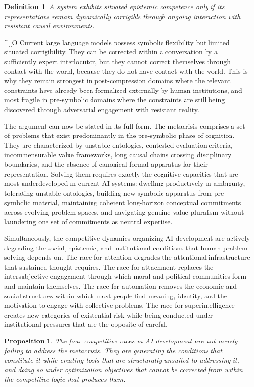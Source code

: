\documentclass[12pt, a4paper]{article}
\newtheorem{proposition}[theorem]{Proposition}
\newtheorem{definition}[theorem]{Definition}
\theoremstyle{remark}
\begin{document}
\begin{definition}
A system exhibits \emph{situated epistemic competence} only if its representations remain dynamically corrigible through ongoing interaction with resistant causal environments.
\end{definition}
^[[O
Current large language models possess symbolic flexibility but limited situated corrigibility. They can be corrected within a conversation by a sufficiently expert interlocutor, but they cannot correct themselves through contact with the world, because they do not have contact with the world. This is why they remain strongest in post-compression domains where the relevant constraints have already been formalized externally by human institutions, and most fragile in pre-symbolic domains where the constraints are still being discovered through adversarial engagement with resistant reality.

The argument can now be stated in its full form. The metacrisis comprises a set of problems that exist predominantly in the pre-symbolic phase of cognition. They are characterized by unstable ontologies, contested evaluation criteria, incommensurable value frameworks, long causal chains crossing disciplinary boundaries, and the absence of canonical formal apparatus for their representation. Solving them requires exactly the cognitive capacities that are most underdeveloped in current AI systems: dwelling productively in ambiguity, tolerating unstable ontologies, building new symbolic apparatus from pre-symbolic material, maintaining coherent long-horizon conceptual commitments across evolving problem spaces, and navigating genuine value pluralism without laundering one set of commitments as neutral expertise.

Simultaneously, the competitive dynamics organizing AI development are actively degrading the social, epistemic, and institutional conditions that human problem-solving depends on. The race for attention degrades the attentional infrastructure that sustained thought requires. The race for attachment replaces the intersubjective engagement through which moral and political communities form and maintain themselves. The race for automation removes the economic and social structures within which most people find meaning, identity, and the motivation to engage with collective problems. The race for superintelligence creates new categories of existential risk while being conducted under institutional pressures that are the opposite of careful.

\begin{proposition}
The four competitive races in AI development are not merely failing to address the metacrisis. They are generating the conditions that constitute it while creating tools that are structurally unsuited to addressing it, and doing so under optimization objectives that cannot be corrected from within the competitive logic that produces them.
\end{proposition}
\end{document}

